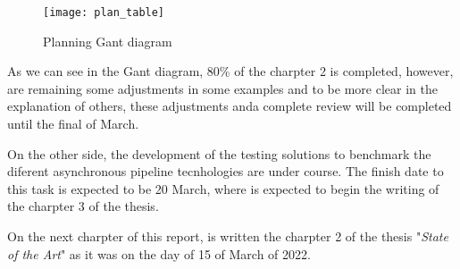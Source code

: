 \begin{figure}[ht]
	\texttt{[image: plan\_table]}
	  \caption{Planning Gant diagram}
  \label{fig:pla}
\end{figure}

As we can see in the Gant diagram, 80\% of the charpter 2 is completed, however, are remaining some adjustments in some examples and to be more clear in the explanation of others, these adjustments anda complete review will be completed until the final of March.

On the other side, the development of the testing solutions to benchmark the diferent asynchronous pipeline tecnhologies are under course. The finish date to this task is expected to be 20 March, where is expected to begin the writing of the charpter 3 of the thesis.

On the next charpter of this report, is written the charpter 2 of the thesis "\textit{State of the Art}" as it was on the day of 15 of March of 2022.

